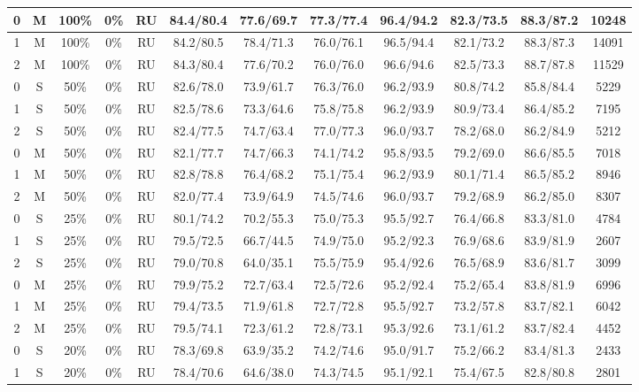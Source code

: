 \begin{table*}
{\begin{tabular}{|c|c|c|c|c||c|c|c|c|c|c||c|}
0 & M & 100\% & 0\% & RU & 84.4/80.4 & 77.6/69.7 & 77.3/77.4 & 96.4/94.2 & 82.3/73.5 & 88.3/87.2 & 10248 \\ \hline
1 & M & 100\% & 0\% & RU & 84.2/80.5 & 78.4/71.3 & 76.0/76.1 & 96.5/94.4 & 82.1/73.2 & 88.3/87.3 & 14091 \\ \hline
2 & M & 100\% & 0\% & RU & 84.3/80.4 & 77.6/70.2 & 76.0/76.0 & 96.6/94.6 & 82.5/73.3 & 88.7/87.8 & 11529 \\ \hline
0 & S & 50\% & 0\% & RU & 82.6/78.0 & 73.9/61.7 & 76.3/76.0 & 96.2/93.9 & 80.8/74.2 & 85.8/84.4 & 5229 \\ \hline
1 & S & 50\% & 0\% & RU & 82.5/78.6 & 73.3/64.6 & 75.8/75.8 & 96.2/93.9 & 80.9/73.4 & 86.4/85.2 & 7195 \\ \hline
2 & S & 50\% & 0\% & RU & 82.4/77.5 & 74.7/63.4 & 77.0/77.3 & 96.0/93.7 & 78.2/68.0 & 86.2/84.9 & 5212 \\ \hline
0 & M & 50\% & 0\% & RU & 82.1/77.7 & 74.7/66.3 & 74.1/74.2 & 95.8/93.5 & 79.2/69.0 & 86.6/85.5 & 7018 \\ \hline
1 & M & 50\% & 0\% & RU & 82.8/78.8 & 76.4/68.2 & 75.1/75.4 & 96.2/93.9 & 80.1/71.4 & 86.5/85.2 & 8946 \\ \hline
2 & M & 50\% & 0\% & RU & 82.0/77.4 & 73.9/64.9 & 74.5/74.6 & 96.0/93.7 & 79.2/68.9 & 86.2/85.0 & 8307 \\ \hline
0 & S & 25\% & 0\% & RU & 80.1/74.2 & 70.2/55.3 & 75.0/75.3 & 95.5/92.7 & 76.4/66.8 & 83.3/81.0 & 4784 \\ \hline
1 & S & 25\% & 0\% & RU & 79.5/72.5 & 66.7/44.5 & 74.9/75.0 & 95.2/92.3 & 76.9/68.6 & 83.9/81.9 & 2607 \\ \hline
2 & S & 25\% & 0\% & RU & 79.0/70.8 & 64.0/35.1 & 75.5/75.9 & 95.4/92.6 & 76.5/68.9 & 83.6/81.7 & 3099 \\ \hline
0 & M & 25\% & 0\% & RU & 79.9/75.2 & 72.7/63.4 & 72.5/72.6 & 95.2/92.4 & 75.2/65.4 & 83.8/81.9 & 6996 \\ \hline
1 & M & 25\% & 0\% & RU & 79.4/73.5 & 71.9/61.8 & 72.7/72.8 & 95.5/92.7 & 73.2/57.8 & 83.7/82.1 & 6042 \\ \hline
2 & M & 25\% & 0\% & RU & 79.5/74.1 & 72.3/61.2 & 72.8/73.1 & 95.3/92.6 & 73.1/61.2 & 83.7/82.4 & 4452 \\ \hline
0 & S & 20\% & 0\% & RU & 78.3/69.8 & 63.9/35.2 & 74.2/74.6 & 95.0/91.7 & 75.2/66.2 & 83.4/81.3 & 2433 \\ \hline
1 & S & 20\% & 0\% & RU & 78.4/70.6 & 64.6/38.0 & 74.3/74.5 & 95.1/92.1 & 75.4/67.5 & 82.8/80.8 & 2801 \\ \hline

\end{tabular}}
\end{table*}
